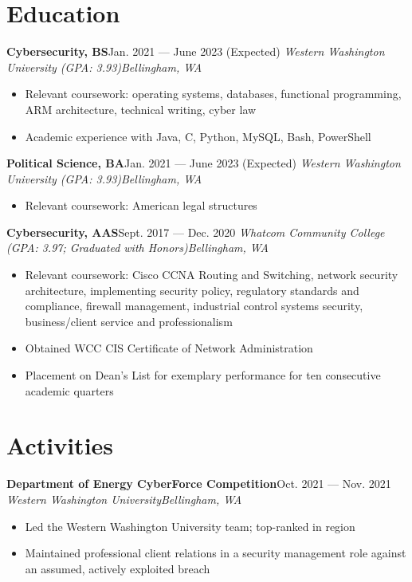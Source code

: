 \documentclass{article}
\newcommand{\topLevelItem}[5]{
    \textbf{#1}\hfill #4 — #5\newline
    \emph{#2\hfill #3}\newline
    \vspace{-18pt}\begin{itemize}
}
\newcommand{\topLevelItemEnd}{\end{itemize}\vspace{5pt}}
\newcommand{\lowLevelItem}[1]{
    \item\small{#1}\vspace{-8pt}
}
\begin{document}
    \section*{Education}
        \topLevelItem{Cybersecurity, BS}{Western Washington University (GPA: 3.93)}{Bellingham, WA}{Jan. 2021}{June 2023 (Expected)}
            \lowLevelItem{Relevant coursework: operating systems, databases, functional programming, ARM architecture, technical writing, cyber law}
            \lowLevelItem{Academic experience with Java, C, Python, MySQL, Bash, PowerShell}
        \topLevelItemEnd
        \topLevelItem{Political Science, BA}{Western Washington University (GPA: 3.93)}{Bellingham, WA}{Jan. 2021}{June 2023 (Expected)}
            \lowLevelItem{Relevant coursework: American legal structures}
        \topLevelItemEnd
        \topLevelItem{Cybersecurity, AAS}{Whatcom Community College (GPA: 3.97; Graduated with Honors)}{Bellingham, WA}{Sept. 2017}{Dec. 2020}
            \lowLevelItem{Relevant coursework: Cisco CCNA Routing and Switching, network security architecture, implementing security policy, regulatory standards and compliance, firewall management, industrial control systems security, business/client service and professionalism}
            \lowLevelItem{Obtained WCC CIS Certificate of Network Administration}
            \lowLevelItem{Placement on Dean’s List for exemplary performance for ten consecutive academic quarters}
        \topLevelItemEnd
        
    \section*{Activities}
        \topLevelItem{Department of Energy CyberForce Competition}{Western Washington University}{Bellingham, WA}{Oct. 2021}{Nov. 2021}
            \lowLevelItem{Led the Western Washington University team; top-ranked in region}
            \lowLevelItem{Maintained professional client relations in a security management role against an assumed, actively exploited breach}
        \topLevelItemEnd
        
\end{document}
